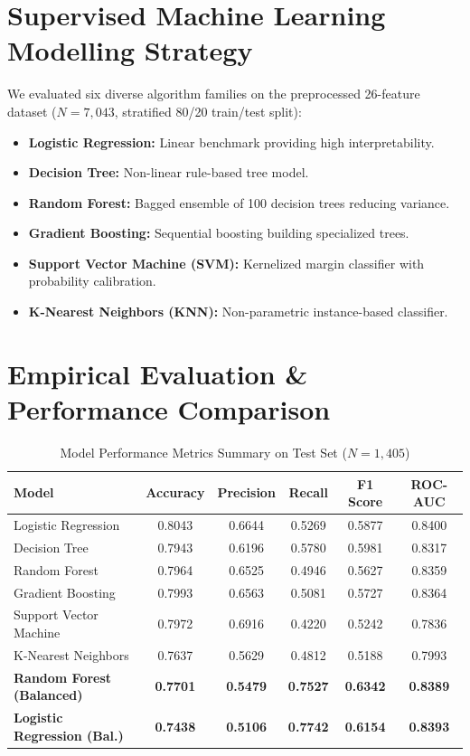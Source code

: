 \documentclass[11pt,a4paper]{article}
\begin{document}
\section{Supervised Machine Learning Modelling Strategy}
We evaluated six diverse algorithm families on the preprocessed 26-feature dataset ($N=7,043$, stratified 80/20 train/test split):
\begin{itemize}
    \item \textbf{Logistic Regression:} Linear benchmark providing high interpretability.
    \item \textbf{Decision Tree:} Non-linear rule-based tree model.
    \item \textbf{Random Forest:} Bagged ensemble of 100 decision trees reducing variance.
    \item \textbf{Gradient Boosting:} Sequential boosting building specialized trees.
    \item \textbf{Support Vector Machine (SVM):} Kernelized margin classifier with probability calibration.
    \item \textbf{K-Nearest Neighbors (KNN):} Non-parametric instance-based classifier.
\end{itemize}

\section{Empirical Evaluation \& Performance Comparison}
\begin{table}[h!]
\centering
\caption{Model Performance Metrics Summary on Test Set ($N=1,405$)}
\begin{tabular}{lccccc}
\toprule
\textbf{Model} & \textbf{Accuracy} & \textbf{Precision} & \textbf{Recall} & \textbf{F1 Score} & \textbf{ROC-AUC} \\
\midrule
Logistic Regression & 0.8043 & 0.6644 & 0.5269 & 0.5877 & 0.8400 \\
Decision Tree & 0.7943 & 0.6196 & 0.5780 & 0.5981 & 0.8317 \\
Random Forest & 0.7964 & 0.6525 & 0.4946 & 0.5627 & 0.8359 \\
Gradient Boosting & 0.7993 & 0.6563 & 0.5081 & 0.5727 & 0.8364 \\
Support Vector Machine & 0.7972 & 0.6916 & 0.4220 & 0.5242 & 0.7836 \\
K-Nearest Neighbors & 0.7637 & 0.5629 & 0.4812 & 0.5188 & 0.7993 \\
\midrule
\textbf{Random Forest (Balanced)} & \textbf{0.7701} & \textbf{0.5479} & \textbf{0.7527} & \textbf{0.6342} & \textbf{0.8389} \\
\textbf{Logistic Regression (Bal.)} & \textbf{0.7438} & \textbf{0.5106} & \textbf{0.7742} & \textbf{0.6154} & \textbf{0.8393} \\
\bottomrule
\end{tabular}
\end{table}
\end{document}
